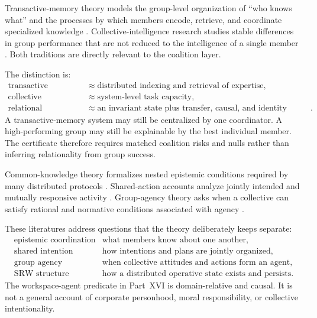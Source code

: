 
Transactive-memory theory models the group-level organization of ``who knows
what'' and the processes by which members encode, retrieve, and coordinate
specialized knowledge \cite{Wegner1987,Lewis2003}. Collective-intelligence
research studies stable differences in group performance that are not reduced
to the intelligence of a single member \cite{WoolleyEtAl2010}. Both traditions
are directly relevant to the coalition layer.

The distinction is:
\[
\begin{aligned}
\text{transactive memory}
&\approx
\text{distributed indexing and retrieval of expertise},\\
\text{collective intelligence}
&\approx
\text{system-level task capacity},\\
\text{relational workspace}
&\approx
\text{an invariant state plus transfer, causal, and identity structure}.
\end{aligned}
\]
A transactive-memory system may still be centralized by one coordinator. A
high-performing group may still be explainable by the best individual member.
The certificate therefore requires matched coalition risks and nulls
rather than inferring relationality from group success.


Common-knowledge theory formalizes nested epistemic conditions required by
many distributed protocols \cite{HalpernMoses1990,FaginEtAl1995}. Shared-action
accounts analyze jointly intended and mutually responsive activity
\cite{Bratman1992}. Group-agency theory asks when a collective can satisfy
rational and normative conditions associated with agency
\cite{ListPettit2011}.

These literatures address questions that the theory deliberately keeps
separate:
\[
\begin{array}{ll}
\text{epistemic coordination} & \text{what members know about one another},\\
\text{shared intention} & \text{how intentions and plans are jointly organized},\\
\text{group agency} & \text{when collective attitudes and actions form an agent},\\
\text{SRW structure} & \text{how a distributed operative state exists and persists}.
\end{array}
\]
The workspace-agent predicate in Part~XVI is domain-relative and causal. It is
not a general account of corporate personhood, moral responsibility, or
collective intentionality.

